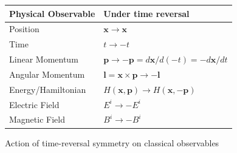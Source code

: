 \documentclass[preprint]{SciPost}
\newcommand{\vect}[1]{\boldsymbol{#1}}
\theoremstyle{plain} %
\begin{document}
\begin{figure}[htbp]
	\centering
	\begin{tabular}{|p{5cm}|p{6cm}|}
		\toprule
		Physical Observable & Under time reversal \\
		\midrule
		Position & \( \vect{x} \rightarrow \vect{x}\) \\
		Time & \( t \rightarrow -t\) \\
		Linear Momentum & \(\vect{p} \rightarrow -\vect{p} = d\vect{x}/d(-t) = - d\vect{x}/dt\) \\
		Angular Momentum & \( \vect{l} = \vect{x} \times \vect{p} \rightarrow -\vect{l} \)  \\
		Energy/Hamiltonian & \( H(\vect{x},\vect{p}) \rightarrow H(\vect{x}, -\vect{p}) \)  \\
		Electric Field & \( E^i \rightarrow -E^i\) \\
		Magnetic Field & \( B^i \rightarrow - B^i \) \\
		\bottomrule
	\end{tabular}
	\caption{Action of time-reversal symmetry on classical observables}
	\label{tbl:trs-classical}
\end{figure}
\end{document}
